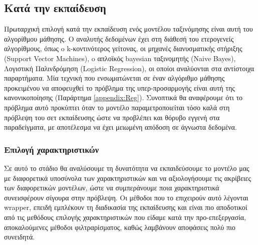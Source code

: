 \subsection{Κατά την εκπαίδευση}
Πρωταρχική επιλογή κατά την εκπαίδευση ενός μοντέλου ταξινόμησης είναι αυτή του αλγορίθμου μάθησης. Ο αναλυτής δεδομένων έχει στη διάθεσή του ετερογενείς αλγορίθμους, όπως o k-κοντινότερος γείτονας, οι μηχανές διανυσματικής στήριξης (Support Vector Machines), o απλοϊκός bayesian ταξινομητής (Naive Bayes), Λογιστική Παλινδρόμηση (Logistic Regression), οι οποίοι αναλύονται στα αντίστοιχα παραρτήματα. Μία τεχνική που ενσωματώνεται σε έναν αλγόριθμο μάθησης προκειμένου να αποφευχθεί το πρόβλημα της υπερ-προσαρμογής είναι αυτή της κανονικοποίησης (Παράρτημα \ref{appendix:Reg}). Συνοπτικά θα αναφέρουμε ότι το πρόβλημα αυτό προκύπτει όταν το μοντέλο παραμετροποιείται τόσο καλά στη πρόβλεψη του σετ εκπαίδευσης ώστε να προβλέπει και θόρυβο εγγενή στα παραδείγματα, με αποτέλεσμα να έχει μειωμένη απόδοση σε άγνωστα δεδομένα.

\subsubsection{Επιλογή χαρακτηριστικών} \label{section:selection}
Σε αυτό το στάδιο θα αναλύσουμε τη δυνατότητα να εκπαιδεύσουμε το μοντέλο μας με διαφορετικά υποσύνολα των χαρακτηριστικών και να αξιολογήσουμε τις ακρίβειες των διαφορετικών μοντέλων, ώστε να συμπεράνουμε ποια χαρακτηριστικά συνεισφέρουν σίγουρα στην πρόβλεψη. Οι μέθοδοι που το επιχειρούν αυτό λέγονται wrapper, επειδή εμπλέκουν  τη διαδικασία της εκπαίδευσης και είναι πιο αποδοτικοί από τις μεθόδους επιλογής χαρακτηριστικών που είδαμε κατά την προ-επεξεργασία, αποκαλούμενες μέθοδοι φιλτραρίσματος, καθώς λαμβάνουν αποφάσεις πολύ πιο συνειδητά.

